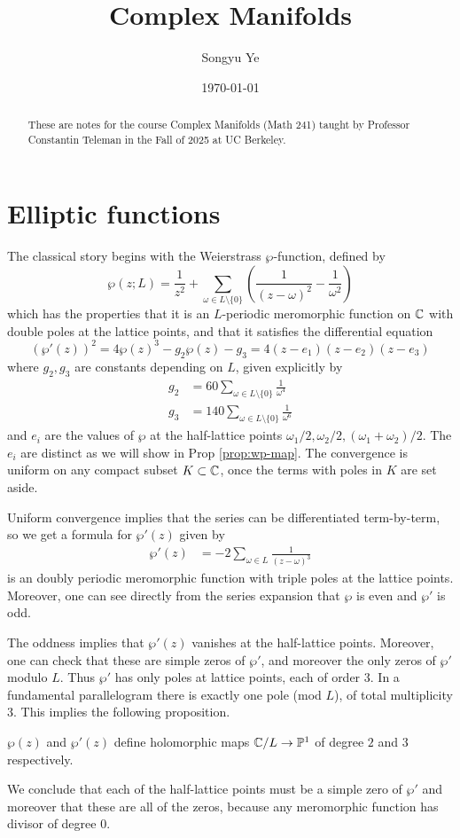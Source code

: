 \documentclass[12pt]{article}
\begin{document}
\rhead{\today}
\cfoot{\thepage}

\title{Complex Manifolds}

\author{Songyu Ye}
\date{\today}
\maketitle


\begin{abstract}
    These are notes for the course Complex Manifolds (Math 241) taught by Professor Constantin Teleman in the Fall of 2025 at UC Berkeley.
\end{abstract}

\tableofcontents
\section{Elliptic functions}
The classical story begins with the Weierstrass $\wp$-function, defined by
\[\wp(z;L) = \frac{1}{z^2} + \sum_{\omega \in L\setminus\{0\}} \left(\frac{1}{(z-\omega)^2} - \frac{1}{\omega^2}\right)\]
which has the properties that it is an $L$-periodic meromorphic function on $\mathbb{C}$ with double poles at the lattice points, and that it satisfies the differential equation
\[(\wp'(z))^2 = 4\wp(z)^3 - g_2\wp(z) - g_3 = 4(z - e_1)(z - e_2)(z - e_3)\]
where $g_2,g_3$ are constants depending on $L$, given explicitly by \begin{align*}
    g_2 & = 60\sum_{\omega \in L\setminus\{0\}} \frac{1}{\omega^4} \\
    g_3 & = 140\sum_{\omega \in L\setminus\{0\}} \frac{1}{\omega^6}
\end{align*} and $e_i$ are the values of $\wp$ at the half-lattice points $\omega_1/2, \omega_2/2, (\omega_1+\omega_2)/2$. The $e_i$ are distinct as we will show in Prop \ref{prop:wp-map}.
The convergence is uniform on any compact subset $K \subset \mathbb{C}$, once the terms with poles in $K$ are set aside.

Uniform convergence implies that the series can be differentiated term-by-term, so we get a formula for $\wp'(z)$ given by \begin{align*}
    \wp'(z) & = -2\sum_{\omega \in L} \frac{1}{(z-\omega)^3}
\end{align*} is an doubly periodic meromorphic function with triple poles at the lattice points. Moreover, one can see directly from the series expansion that $\wp$ is even and $\wp'$ is odd.

The oddness implies that $\wp'(z)$ vanishes at the half-lattice points. Moreover, one can check that these are simple zeros of $\wp'$, and moreover the only zeros of $\wp'$ modulo $L$. Thus $\wp'$ has only poles at lattice points, each of order 3. In a fundamental parallelogram there is exactly one pole (mod $L$), of total multiplicity 3. This implies the following proposition.
\begin{proposition}
    $\wp(z)$ and $\wp'(z)$ define holomorphic maps $\mathbb{C}/L \to \mathbb{P}^1$ of degree $2$ and $3$ respectively.
\end{proposition}
We conclude that each of the half-lattice points must be a simple zero of $\wp'$ and moreover that these are all of the zeros, because any meromorphic function has divisor of degree 0.
\end{document}
